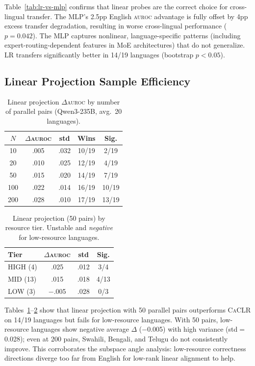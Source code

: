 \documentclass[11pt,a4paper]{article}
\newcommand{\auroc}{\textsc{auroc}}
\newcommand{\caclr}{\textsc{CaCLR}}
\begin{document}
Table~\ref{tab:lr-vs-mlp} confirms that linear probes are the correct choice for cross-lingual transfer.
The MLP's 2.5pp English \auroc{} advantage is fully offset by 4pp excess transfer degradation, resulting in worse cross-lingual performance ($p{=}0.042$).
The MLP captures nonlinear, language-specific patterns (including expert-routing-dependent features in MoE architectures) that do not generalize.
LR transfers significantly better in 14/19 languages (bootstrap $p{<}0.05$).

\subsection{Linear Projection Sample Efficiency}
\label{sec:proj-results}

\begin{table}[t]
\centering
\small
\begin{tabular}{ccccc}
\toprule
$N$ & $\Delta$\auroc{} & std & Wins & Sig. \\
\midrule
10 & .005 & .032 & 10/19 & 2/19 \\
20 & .010 & .025 & 12/19 & 4/19 \\
50 & .015 & .020 & 14/19 & 7/19 \\
100 & .022 & .014 & 16/19 & 10/19 \\
200 & .028 & .010 & 17/19 & 13/19 \\
\bottomrule
\end{tabular}
\caption{Linear projection $\Delta$\auroc{} by number of parallel pairs (Qwen3-235B, avg.\ 20 languages).}
\label{tab:proj-efficiency}
\end{table}

\begin{table}[t]
\centering
\small
\begin{tabular}{lccc}
\toprule
\textbf{Tier} & $\Delta$\auroc{} & std & Sig. \\
\midrule
HIGH (4) & .025 & .012 & 3/4 \\
MID (13) & .015 & .018 & 4/13 \\
LOW (3) & $-$.005 & .028 & 0/3 \\
\bottomrule
\end{tabular}
\caption{Linear projection (50 pairs) by resource tier. Unstable and \emph{negative} for low-resource languages.}
\label{tab:proj-tier}
\end{table}

Tables~\ref{tab:proj-efficiency}--\ref{tab:proj-tier} show that linear projection with 50 parallel pairs outperforms \caclr{} on 14/19 languages but fails for low-resource languages.
With 50 pairs, low-resource languages show negative average $\Delta$ ($-$0.005) with high variance (std$=$0.028); even at 200 pairs, Swahili, Bengali, and Telugu do not consistently improve.
This corroborates the subspace angle analysis: low-resource correctness directions diverge too far from English for low-rank linear alignment to help.
\end{document}
